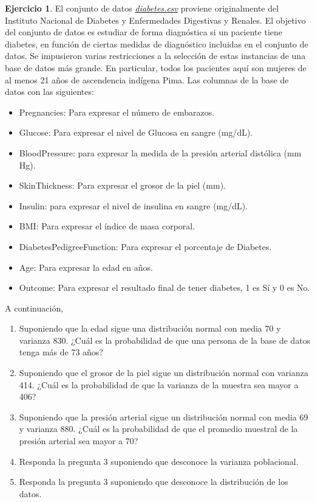 \documentclass[
  11pt,
]{book}
\providecommand{\tightlist}{%
  \setlength{\itemsep}{0pt}\setlength{\parskip}{0pt}}
\theoremstyle{definition}
\theoremstyle{definition}
\theoremstyle{definition}
\newtheorem{exercise}{Ejercicio}[chapter]
\theoremstyle{definition}
\theoremstyle{remark}
\begin{document}
\begin{exercise}

El conjunto de datos \href{https://raw.githubusercontent.com/Dfranzani/Bases-de-datos-para-cursos/main/2022-2/Estad\%C3\%ADstica\%201/diabetes.csv}{\emph{diabetes.csv}} proviene originalmente del Instituto Nacional de Diabetes y Enfermedades Digestivas y Renales. El objetivo del conjunto de datos es estudiar de forma diagnóstica si un paciente tiene diabetes, en función de ciertas medidas de diagnóstico incluidas en el conjunto de datos. Se impusieron varias restricciones a la selección de estas instancias de una base de datos más grande. En particular, todos los pacientes aquí son mujeres de al menos 21 años de ascendencia indígena Pima. Las columnas de la base de datos con las siguientes:

\begin{itemize}
\tightlist
\item
  Pregnancies: Para expresar el número de embarazos.
\item
  Glucose: Para expresar el nivel de Glucosa en sangre (mg/dL).
\item
  BloodPressure: para expresar la medida de la presión arterial distólica (mm Hg).
\item
  SkinThickness: Para expresar el grosor de la piel (mm).
\item
  Insulin: para expresar el nivel de insulina en sangre (mg/dL).
\item
  BMI: Para expresar el índice de masa corporal.
\item
  DiabetesPedigreeFunction: Para expresar el porcentaje de Diabetes.
\item
  Age: Para expresar la edad en años.
\item
  Outcome: Para expresar el resultado final de tener diabetes, 1 es Sí y 0 es No.
\end{itemize}

A continuación,

\begin{enumerate}
\def\labelenumi{\arabic{enumi}.}
\tightlist
\item
  Suponiendo que la edad sigue una distribución normal con media 70 y varianza 830. ¿Cuál es la probabilidad de que una persona de la base de datos tenga más de 73 años?
\item
  Suponiendo que el grosor de la piel sigue un distribución normal con varianza 414. ¿Cuál es la probabilidad de que la varianza de la muestra sea mayor a 406?
\item
  Suponiendo que la presión arterial sigue un distribución normal con media 69 y varianza 880. ¿Cuál es la probabilidad de que el promedio muestral de la presión arterial sea mayor a 70?
\item
  Responda la pregunta 3 suponiendo que desconoce la varianza poblacional.
\item
  Responda la pregunta 3 suponiendo que desconoce la distribución de los datos.
\end{enumerate}

\end{exercise}

\backmatter


\end{document}

